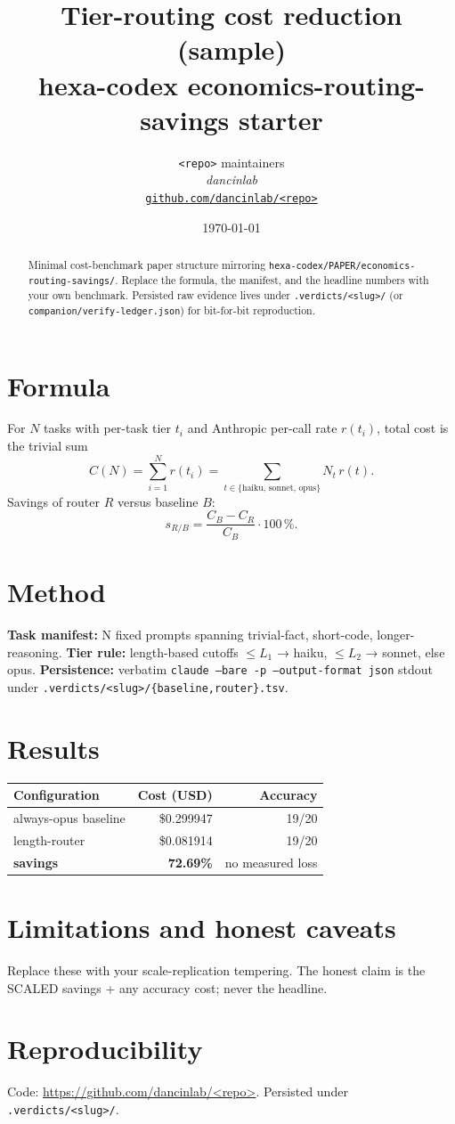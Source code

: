 \documentclass[11pt,a4paper]{article}
\title{\textbf{Tier-routing cost reduction (sample)}\\[2pt]\large hexa-codex economics-routing-savings starter}
\author{\texttt{<repo>} maintainers\\\normalsize\textit{dancinlab}\\[2pt]\normalsize\href{https://github.com/dancinlab/<repo>}{\texttt{github.com/dancinlab/<repo>}}}
\date{\today}
\begin{document}
\maketitle
\begin{abstract}
Minimal cost-benchmark paper structure mirroring \texttt{hexa-codex/PAPER/economics-routing-savings/}. Replace the formula, the manifest, and the headline numbers with your own benchmark. Persisted raw evidence lives under \texttt{.verdicts/<slug>/} (or \texttt{companion/verify-ledger.json}) for bit-for-bit reproduction.
\end{abstract}

\section{Formula}
For $N$ tasks with per-task tier $t_i$ and Anthropic per-call rate $r(t_i)$, total cost is the trivial sum
\begin{equation}
  C(N) = \sum_{i=1}^{N} r(t_i) = \sum_{t \in \{\text{haiku, sonnet, opus}\}} N_t \, r(t).
\end{equation}
Savings of router $R$ versus baseline $B$:
\begin{equation}
  s_{R/B} = \frac{C_B - C_R}{C_B} \cdot 100\,\%.
\end{equation}

\section{Method}
\textbf{Task manifest:} N fixed prompts spanning trivial-fact, short-code, longer-reasoning. \textbf{Tier rule:} length-based cutoffs $\le L_1$ → haiku, $\le L_2$ → sonnet, else opus. \textbf{Persistence:} verbatim \texttt{claude --bare -p --output-format json} stdout under \texttt{.verdicts/<slug>/\{baseline,router\}.tsv}.

\section{Results}
\begin{table}[h]\centering\small
\begin{tabular}{lrr}\toprule
\textbf{Configuration} & \textbf{Cost (USD)} & \textbf{Accuracy} \\\midrule
always-opus baseline & \$0.299947 & 19/20 \\
length-router        & \$0.081914 & 19/20 \\\midrule
\textbf{savings}     & \textbf{72.69\%} & no measured loss \\\bottomrule
\end{tabular}\end{table}

\section{Limitations and honest caveats}
Replace these with your scale-replication tempering. The honest claim is the SCALED savings + any accuracy cost; never the headline.

\section{Reproducibility}
Code: \url{https://github.com/dancinlab/<repo>}. Persisted under \texttt{.verdicts/<slug>/}.
\end{document}
